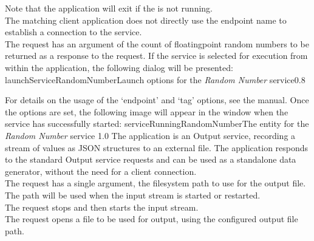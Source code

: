 Note that the application will exit if the  is not
running.\\

\insertAutoAppParameters
{}
The matching client application does not directly use the endpoint name to establish a
connection to the service.\\

The  request has an argument of the
count of floating\longDash{}point random numbers to be returned as a response to the
request.
%
\condPage
If the service is selected for execution from within the \emph{\CMU} application, the
following dialog will be presented:
%
{launchServiceRandomNumber}{Launch options for the \emph{Random Number} service}{0.8}

For details on the usage of the `endpoint' and `tag' options, see the \emph{\CMU} manual.
Once the options are set, the following image will appear in the \emph{\CMU} window when
the service has successfully started:
%
{serviceRunningRandomNumber}{The \emph{\CMU} entity for the \emph{Random Number} service}%
{1.0}
\condPage
{}
The  application is an Output
service, recording a stream of \yarp{} values as JSON structures to an external file.
The application responds to the standard Output service requests and can be used as a
standalone data generator, without the need for a client connection.\\

The  request has a single argument,
the file\longDash{}system path to use for the output file.
The path will be used when the input stream is started or restarted.\\

The  request stops and then
starts the input stream.\\

The  request opens a file to be
used for output, using the configured output file path.\\

